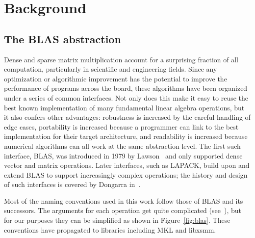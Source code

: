 \chapter{Background}
\label{chapter:review}

\section{The BLAS abstraction}

Dense and sparse matrix multiplication account for a surprising fraction of all computation, particularly in scientific and engineering fields. Since any optimization or algorithmic improvement has the potential to improve the performance of programs across the board, these algorithms have been organized under a series of common interfaces. Not only does this make it easy to reuse the best known implementation of many fundamental linear algebra operations, but it also confers other advantages: robustness is increased by the careful handling of edge cases, portability is increased because a programmer can link to the best implementation for their target architecture, and readability is increased because numerical algorithms can all work at the same abstraction level. The first such interface, \gls{BLAS}, was introduced in 1979 by Lawson~\cite{Lawson:1979:BLA:355841.355847} and only supported dense vector and matrix operations. Later interfaces, such as LAPACK, build upon and extend \gls{BLAS} to support increasingly complex operations; the history and design of such interfaces is covered by Dongarra in~\cite{Dongarra:1998:NLA:552704}. 

Most of the naming conventions used in this work follow those of BLAS and its successors. The arguments for each operation get quite complicated (see~\cite{IntelCSCMM}), but for our purposes they can be simplified as shown in Figure~\ref{fig:blas}. These conventions have propagated to libraries including MKL and libxsmm.

